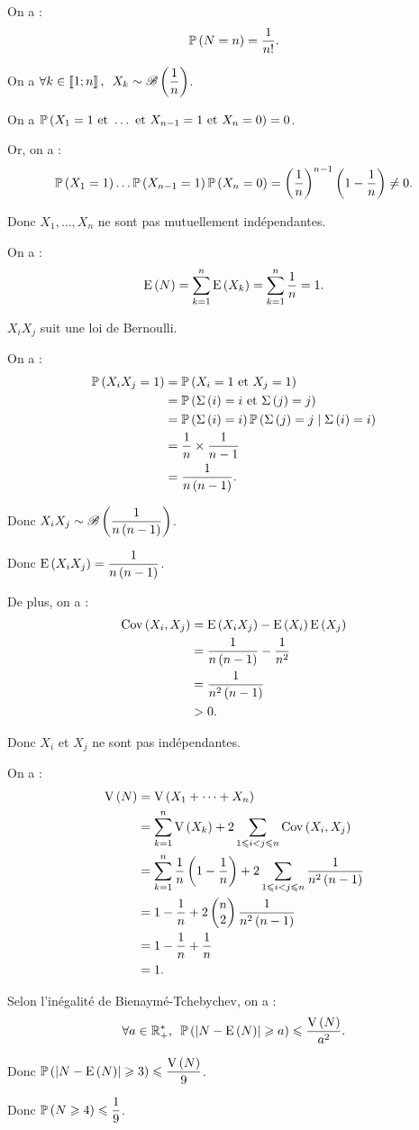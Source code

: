 \begin{corr}[1]
On a : \[\proba{N=n}=\dfrac{1}{n!}.\]
\end{corr}

\begin{corr}[2]
On a \(\quantifs{\forall k\in\interventierii{1}{n}}X_k\sim\loibernoulli{\dfrac{1}{n}}\).

On a \(\proba{X_1=1\text{ et }\dots\text{ et }X_{n-1}=1\text{ et }X_n=0}=0\).

Or, on a : \[\proba{X_1=1}\dots\proba{X_{n-1}=1}\proba{X_n=0}=\paren{\dfrac{1}{n}}^{n-1}\paren{1-\dfrac{1}{n}}\not=0.\]

Donc \(X_1,\dots,X_n\) ne sont pas mutuellement indépendantes.
\end{corr}

\begin{corr}[3]
On a : \[\esp{N}=\sum_{k=1}^n\esp{X_k}=\sum_{k=1}^n\dfrac{1}{n}=1.\]
\end{corr}

\begin{corr}[4]
\(X_iX_j\) suit une loi de Bernoulli.

On a : \[\begin{aligned}
\proba{X_iX_j=1}&=\proba{X_i=1\text{ et }X_j=1} \\
&=\proba{\Sigma\paren{i}=i\text{ et }\Sigma\paren{j}=j} \\
&=\proba{\Sigma\paren{i}=i}\proba{\Sigma\paren{j}=j\mid\Sigma\paren{i}=i} \\
&=\dfrac{1}{n}\times\dfrac{1}{n-1} \\
&=\dfrac{1}{n\paren{n-1}}.
\end{aligned}\]

Donc \(X_iX_j\sim\loibernoulli{\dfrac{1}{n\paren{n-1}}}\).

Donc \(\esp{X_iX_j}=\dfrac{1}{n\paren{n-1}}\).

De plus, on a : \[\begin{aligned}
\cov{X_i}{X_j}&=\esp{X_iX_j}-\esp{X_i}\esp{X_j} \\
&=\dfrac{1}{n\paren{n-1}}-\dfrac{1}{n^2} \\
&=\dfrac{1}{n^2\paren{n-1}} \\
&>0.
\end{aligned}\]

Donc \(X_i\) et \(X_j\) ne sont pas indépendantes.
\end{corr}

\begin{corr}[5]
On a : \[\begin{aligned}
\vari{N}&=\vari{X_1+\dots+X_n} \\
&=\sum_{k=1}^n\vari{X_k}+2\sum_{1\leq i<j\leq n}\cov{X_i}{X_j} \\
&=\sum_{k=1}^n\dfrac{1}{n}\paren{1-\dfrac{1}{n}}+2\sum_{1\leq i<j\leq n}\dfrac{1}{n^2\paren{n-1}} \\
&=1-\dfrac{1}{n}+2\binom{2}{n}\dfrac{1}{n^2\paren{n-1}} \\
&=1-\dfrac{1}{n}+\dfrac{1}{n} \\
&=1.
\end{aligned}\]
\end{corr}

\begin{corr}[6]
Selon l'inégalité de Bienaymé-Tchebychev, on a : \[\quantifs{\forall a\in\Rps}\proba{\abs{N-\esp{N}}\geq a}\leq\dfrac{\vari{N}}{a^2}.\]

Donc \(\proba{\abs{N-\esp{N}}\geq3}\leq\dfrac{\vari{N}}{9}\).

Donc \(\proba{N\geq4}\leq\dfrac{1}{9}\).
\end{corr}
